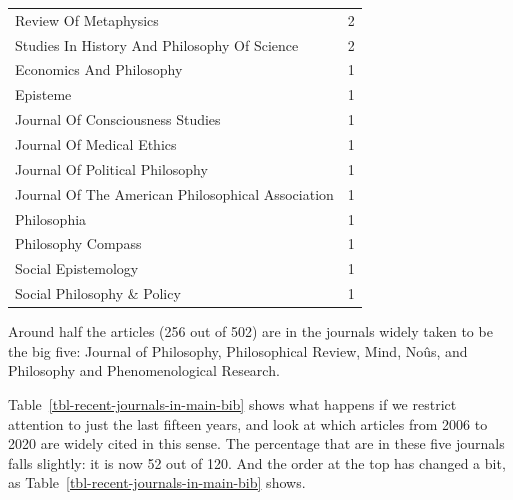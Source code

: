 \documentclass[
  10pt,
  letterpaper,
  DIV=11,
  numbers=noendperiod,
  twoside]{scrartcl}
\begin{document}
\begin{longtable}[]{@{}lr@{}}
Review Of Metaphysics & 2 \\
Studies In History And Philosophy Of Science & 2 \\
Economics And Philosophy & 1 \\
Episteme & 1 \\
Journal Of Consciousness Studies & 1 \\
Journal Of Medical Ethics & 1 \\
Journal Of Political Philosophy & 1 \\
Journal Of The American Philosophical Association & 1 \\
Philosophia & 1 \\
Philosophy Compass & 1 \\
Social Epistemology & 1 \\
Social Philosophy \& Policy & 1 \\

\end{longtable}

Around half the articles (256 out of 502) are in the journals widely
taken to be the big five: Journal of Philosophy, Philosophical Review,
Mind, Noûs, and Philosophy and Phenomenological Research.

Table~\ref{tbl-recent-journals-in-main-bib} shows what happens if we
restrict attention to just the last fifteen years, and look at which
articles from 2006 to 2020 are widely cited in this sense. The
percentage that are in these five journals falls slightly: it is now 52
out of 120. And the order at the top has changed a bit, as
Table~\ref{tbl-recent-journals-in-main-bib} shows.
\end{document}
